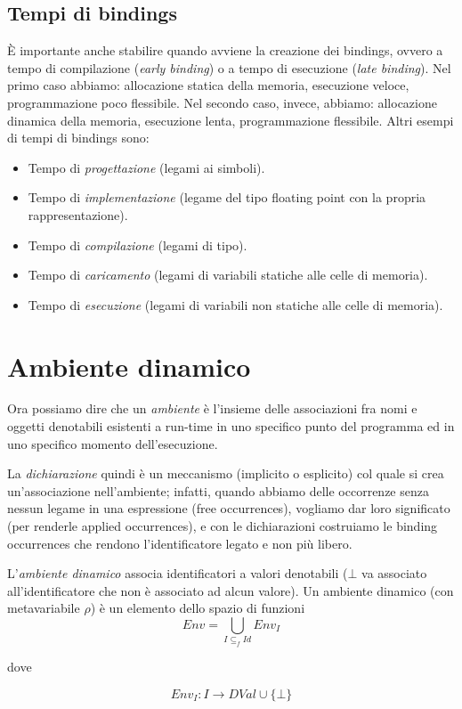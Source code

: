 \documentclass[a4paper,oneside,titlepage]{book}
\begin{document}
\subsection{Tempi di bindings}
È importante anche stabilire quando avviene la creazione dei bindings, ovvero a tempo di compilazione (\textit{early binding}) o a tempo di esecuzione (\textit{late binding}). Nel primo caso abbiamo: allocazione statica della memoria, esecuzione veloce, programmazione poco flessibile. Nel secondo caso, invece, abbiamo: allocazione dinamica della memoria, esecuzione lenta, programmazione flessibile. Altri esempi di tempi di bindings sono:
\begin{itemize}
	\item Tempo di \textit{progettazione} (legami ai simboli).
	\item Tempo di \textit{implementazione} (legame del tipo floating point con la propria rappresentazione).
	\item Tempo di \textit{compilazione} (legami di tipo).
	\item Tempo di \textit{caricamento} (legami di variabili statiche alle celle di memoria).
	\item Tempo di \textit{esecuzione} (legami di variabili non statiche alle celle di memoria).
\end{itemize}

\section{Ambiente dinamico}
Ora possiamo dire che un \textit{ambiente} è l'insieme delle associazioni fra nomi e oggetti denotabili esistenti a run-time in uno specifico punto del programma ed in uno specifico momento dell'esecuzione.

La \textit{dichiarazione} quindi è un meccanismo (implicito o esplicito) col quale si crea un'associazione nell'ambiente; infatti, quando abbiamo delle occorrenze senza nessun legame in una espressione (free occurrences), vogliamo dar loro significato (per renderle applied occurrences), e con le dichiarazioni costruiamo le binding occurrences che rendono l'identificatore legato e non più libero.

L'\textit{ambiente dinamico} associa identificatori a valori denotabili ($\bot$ va associato all'identificatore che non è associato ad alcun valore). Un ambiente dinamico (con metavariabile $\rho$) è un elemento dello spazio di funzioni 
\[ Env=\bigcup\limits_{I \subseteq_f Id} Env_I \]
\begin{center}
	dove
\end{center}
\[ Env_I: I \rightarrow DVal \cup \{\bot\} \]
\end{document}
